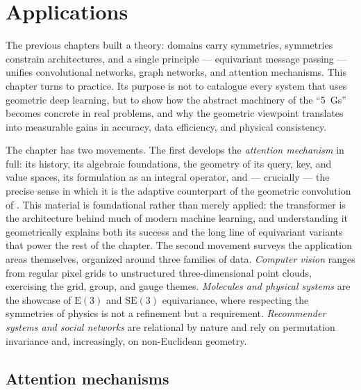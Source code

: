\providecommand{\SO}{\mathrm{SO}}
\providecommand{\SE}{\mathrm{SE}}
\providecommand{\Eucl}{\mathrm{E}}
\providecommand{\Hyp}{\mathbb{H}}
\providecommand{\Attn}{\operatorname{Attention}}
\providecommand{\softmax}{\operatorname{softmax}}
\providecommand{\Concat}{\operatorname{Concat}}
\providecommand{\sigm}{\sigma}
\providecommand{\Lc}{\mathcal{L}}

\chapter{Applications}
\label{ch:applications}

The previous chapters built a theory: domains carry symmetries, symmetries
constrain architectures, and a single principle --- equivariant message
passing --- unifies convolutional networks, graph networks, and attention
mechanisms. This chapter turns to practice. Its purpose is not to catalogue
every system that uses geometric deep learning, but to show how the abstract
machinery of the ``5~Gs'' becomes concrete in real problems, and why the
geometric viewpoint translates into measurable gains in accuracy, data
efficiency, and physical consistency.

The chapter has two movements. The first develops the \emph{attention
mechanism} in full: its history, its algebraic foundations, the geometry of its
query, key, and value spaces, its formulation as an integral operator, and ---
crucially --- the precise sense in which it is the adaptive counterpart of the
geometric convolution of . This material is foundational
rather than merely applied: the transformer is the architecture behind much of
modern machine learning, and understanding it geometrically explains both its
success and the long line of equivariant variants that power the rest of the
chapter. The second movement surveys the application areas themselves,
organized around three families of data. \emph{Computer vision} ranges from
regular pixel grids to unstructured three-dimensional point clouds, exercising
the grid, group, and gauge themes. \emph{Molecules and physical systems} are the
showcase of $\Eucl(3)$ and $\SE(3)$ equivariance, where respecting the
symmetries of physics is not a refinement but a requirement. \emph{Recommender
systems and social networks} are relational by nature and rely on permutation
invariance and, increasingly, on non-Euclidean geometry.

\section{Attention mechanisms}
\label{sec:apps:attention-foundations}

